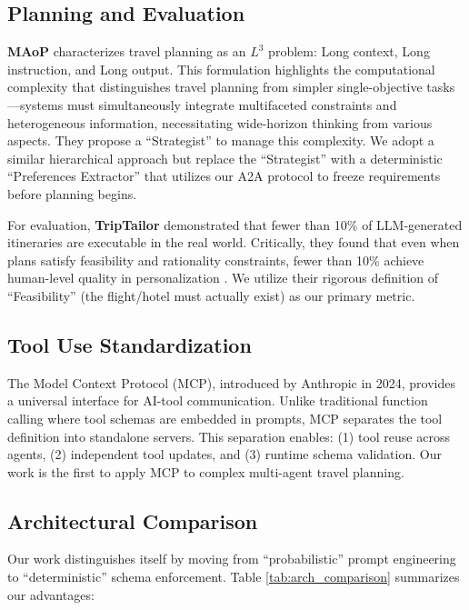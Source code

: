 \documentclass[conference]{IEEEtran}
\begin{document}
\subsection{Planning and Evaluation}
\textbf{MAoP} \cite{yang2025planyourtravel} characterizes travel planning as an $L^3$ problem: Long context, Long instruction, and Long output. This formulation highlights the computational complexity that distinguishes travel planning from simpler single-objective tasks---systems must simultaneously integrate multifaceted constraints and heterogeneous information, necessitating wide-horizon thinking from various aspects. They propose a ``Strategist'' to manage this complexity. We adopt a similar hierarchical approach but replace the ``Strategist'' with a deterministic ``Preferences Extractor'' that utilizes our A2A protocol to freeze requirements before planning begins.

For evaluation, \textbf{TripTailor} \cite{shen2025triptailor} demonstrated that fewer than 10\% of LLM-generated itineraries are executable in the real world. Critically, they found that even when plans satisfy feasibility and rationality constraints, fewer than 10\% achieve human-level quality in personalization \cite{dhote2025smart}. We utilize their rigorous definition of ``Feasibility'' (the flight/hotel must actually exist) as our primary metric.

\subsection{Tool Use Standardization}
The Model Context Protocol (MCP), introduced by Anthropic in 2024, provides a universal interface for AI-tool communication. Unlike traditional function calling where tool schemas are embedded in prompts, MCP separates the tool definition into standalone servers. This separation enables: (1) tool reuse across agents, (2) independent tool updates, and (3) runtime schema validation. Our work is the first to apply MCP to complex multi-agent travel planning.

\subsection{Architectural Comparison}

Our work distinguishes itself by moving from ``probabilistic'' prompt engineering to ``deterministic'' schema enforcement. Table \ref{tab:arch_comparison} summarizes our advantages:
\end{document}
